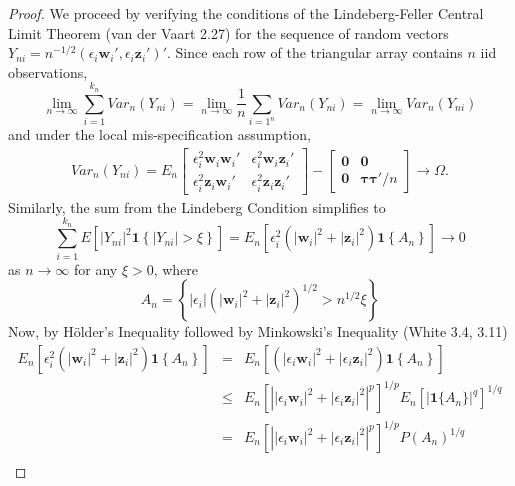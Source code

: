 \documentclass[12pt]{article}
\theoremstyle{definition}
\begin{document}
\begin{proof}
We proceed by verifying the conditions of the Lindeberg-Feller Central Limit Theorem (van der Vaart 2.27) for the sequence of random vectors $Y_{ni} = n^{-1/2}\left(\epsilon_i \mathbf{w}_i', \epsilon_i \mathbf{z}_i' \right)'$. Since each row of the triangular array contains $n$ iid observations, 
  $$\lim_{n\rightarrow \infty}\sum_{i=1}^{k_n} Var_n(Y_{ni}) = \lim_{n\rightarrow \infty} \frac{1}{n} \sum_{i=1^n} Var_n(Y_{ni})= \lim_{n\rightarrow \infty} Var_n(Y_{ni})$$
and under the local mis-specification assumption,
  \begin{eqnarray*}
  Var_n(Y_{ni}) = E_n \left[\begin{array}{cc}
    \epsilon_i^2 \mathbf{w}_i \mathbf{w}_i' &  \epsilon_i^2 \mathbf{w}_i\mathbf{z}_i '\\
    \epsilon_i^2 \mathbf{z}_i \mathbf{w}_i'& \epsilon_i^2 \mathbf{z}_i \mathbf{z}_i'
    \end{array}\right] - \left[\begin{array}{cc}
    \mathbf{0} &  \mathbf{0}\\
    \mathbf{0}& \boldsymbol{\tau}\boldsymbol{\tau}'/n
    \end{array}\right] \rightarrow \Omega.
  \end{eqnarray*}
Similarly, the sum from the Lindeberg Condition simplifies to 
  $$\sum_{i=1}^{k_n} E\left[ \left|Y_{ni} \right|^2 \mathbf{1}\left\{\left|Y_{ni} \right| >\xi \right\}\right]= E_n \left[\epsilon_i^2 \left(\left|\mathbf{w}_i \right|^2 + \left| \mathbf{z}_i\right|^2 \right) \mathbf{1} \left\{A_n\right\}\right] \rightarrow 0$$
as $n \rightarrow \infty$ for any $\xi>0$, where
$$A_n = \left\{\left|\epsilon_i\right| \left( \left|\mathbf{w}_i \right|^2 + \left| \mathbf{z}_i\right|^2\right)^{1/2}  > n^{1/2}\xi\right\}$$ 
Now, by H\"{o}lder's Inequality followed by Minkowski's Inequality (White 3.4, 3.11)
  \begin{eqnarray*}
    E_n \left[\epsilon_i^2 \left(\left|\mathbf{w}_i \right|^2 + \left| \mathbf{z}_i\right|^2 \right) \mathbf{1} \left\{A_n\right\}\right] &=& E_n \left[\left(\left|\epsilon_i\mathbf{w}_i \right|^2 + \left|\epsilon_i \mathbf{z}_i\right|^2 \right) \mathbf{1} \left\{A_n\right\}\right]\\
    &\leq&E_n \left[\left|\left|\epsilon_i\mathbf{w}_i \right|^2 + \left|\epsilon_i \mathbf{z}_i\right|^2 \right|^p\right]^{1/p} E_n\left[\left|\mathbf{1}\{A_n\} \right|^q \right]^{1/q}\\
    &=& E_n \left[\left|\left|\epsilon_i\mathbf{w}_i \right|^2 + \left|\epsilon_i \mathbf{z}_i\right|^2 \right|^p\right]^{1/p} P(A_n)^{1/q}\\

\end{eqnarray*}
\end{proof}
\end{document}
